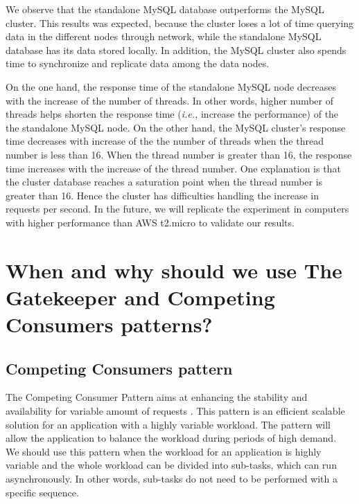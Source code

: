 \documentclass{article}
\begin{document}
We observe that the standalone MySQL database outperforms the MySQL cluster. This results was expected, because the cluster loses a lot of time querying data in the different nodes through network, while the standalone MySQL database has its data stored locally. In addition, the MySQL cluster also spends time to synchronize and replicate data among the data nodes.

On the one hand, the response time of the standalone MySQL node decreases with the increase of the number of threads. In other words, higher number of threads helps shorten the response time (\emph{i.e.,} increase the performance) of the the standalone MySQL node. On the other hand, the MySQL cluster's response time decreases with increase of the the number of threads when the thread number is less than 16. When the thread number is greater than 16, the response time increases with the increase of the thread number. One explanation is that the cluster database reaches a saturation point when the thread number is greater than 16. Hence the cluster has difficulties handling the increase in requests per second. In the future, we will replicate the experiment in computers with higher performance than AWS t2.micro to validate our results.
  

\section{When and why should we use The Gatekeeper and Competing Consumers patterns?}\label{Q2}
\subsection{Competing Consumers pattern}
The Competing Consumer Pattern aims at enhancing the stability and availability for variable amount of requests \cite{ccp_microsoft}. This pattern is an efficient scalable solution for an application with a highly variable workload. The pattern will allow the application to balance the workload during periods of high demand.\\

We should use this pattern when the workload for an application is highly variable and the whole workload can be divided into sub-tasks, which can run asynchronously. In other words, sub-tasks do not need to be performed with a specific sequence. \cite{ccp_microsoft}\\
\end{document}
